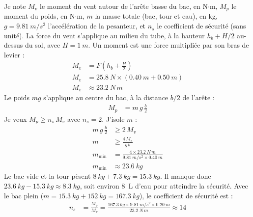 \begin{demonstration}
Je note $M_v$ le moment du vent autour de l'arête basse du bac, en N$\cdot$m, $M_p$ le moment du poids, en N$\cdot$m, $m$ la masse totale (bac, tour et eau), en kg, $g = \qty{9,81}{m/s^2}$ l'accélération de la pesanteur, et $n_s$ le coefficient de sécurité (sans unité). La force du vent s'applique au milieu du tube, à la hauteur $h_b + H/2$ au-dessus du sol, avec $H = \qty{1}{m}$. Un moment est une force multipliée par son bras de levier :
\begin{align*}
M_v &= F\left(h_b + \frac{H}{2}\right)\\
M_v &= \qty{25,8}{N} \times \left(\qty{0,40}{m} + \qty{0,50}{m}\right)\\
M_v &\approx \qty{23,2}{N\,m}
\end{align*}
Le poids $m g$ s'applique au centre du bac, à la distance $b/2$ de l'arête :
\begin{align*}
M_p &= m\, g\, \frac{b}{2}
\end{align*}
Je veux $M_p \ge n_s\, M_v$ avec $n_s = 2$. J'isole $m$ :
\begin{align*}
m\, g\, \frac{b}{2} &\ge 2\, M_v\\
m &\ge \frac{4\, M_v}{g\, b}\\
m_{\min} &= \frac{4 \times \qty{23,2}{N\,m}}{\qty{9,81}{m/s^2} \times \qty{0,40}{m}}\\
m_{\min} &\approx \qty{23,6}{kg}
\end{align*}
Le bac vide et la tour pèsent $\qty{8}{kg} + \qty{7,3}{kg} = \qty{15,3}{kg}$. Il manque donc $\qty{23,6}{kg} - \qty{15,3}{kg} \approx \qty{8,3}{kg}$, soit environ \qty{8}{L} d'eau pour atteindre la sécurité. Avec le bac plein ($m = \qty{15,3}{kg} + \qty{152}{kg} = \qty{167,3}{kg}$), le coefficient de sécurité est :
\begin{align*}
n_s &= \frac{M_p}{M_v} = \frac{\qty{167,3}{kg} \times \qty{9,81}{m/s^2} \times \qty{0,20}{m}}{\qty{23,2}{N\,m}} \approx 14
\end{align*}
\end{demonstration}

